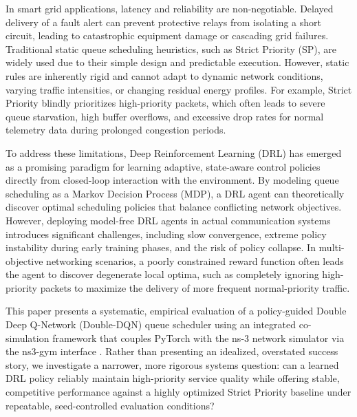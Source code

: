 \documentclass[runningheads,a4paper]{llncs}
\begin{document}
In smart grid applications, latency and reliability are non-negotiable. Delayed delivery of a fault alert can prevent protective relays from isolating a short circuit, leading to catastrophic equipment damage or cascading grid failures. Traditional static queue scheduling heuristics, such as Strict Priority (SP), are widely used due to their simple design and predictable execution. However, static rules are inherently rigid and cannot adapt to dynamic network conditions, varying traffic intensities, or changing residual energy profiles. For example, Strict Priority blindly prioritizes high-priority packets, which often leads to severe queue starvation, high buffer overflows, and excessive drop rates for normal telemetry data during prolonged congestion periods.

To address these limitations, Deep Reinforcement Learning (DRL) has emerged as a promising paradigm for learning adaptive, state-aware control policies directly from closed-loop interaction with the environment. By modeling queue scheduling as a Markov Decision Process (MDP), a DRL agent can theoretically discover optimal scheduling policies that balance conflicting network objectives. However, deploying model-free DRL agents in actual communication systems introduces significant challenges, including slow convergence, extreme policy instability during early training phases, and the risk of policy collapse. In multi-objective networking scenarios, a poorly constrained reward function often leads the agent to discover degenerate local optima, such as completely ignoring high-priority packets to maximize the delivery of more frequent normal-priority traffic.

This paper presents a systematic, empirical evaluation of a policy-guided Double Deep Q-Network (Double-DQN) queue scheduler using an integrated co-simulation framework that couples PyTorch with the ns-3 network simulator via the ns3-gym interface \cite{ns3gym,boni2021ns3gym}. Rather than presenting an idealized, overstated success story, we investigate a narrower, more rigorous systems question: can a learned DRL policy reliably maintain high-priority service quality while offering stable, competitive performance against a highly optimized Strict Priority baseline under repeatable, seed-controlled evaluation conditions? 
\end{document}
